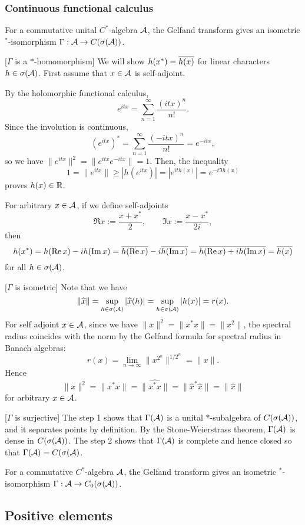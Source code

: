 \documentclass{../exp}
\begin{document}
\subsubsection{Continuous functional calculus}
\begin{thm}
For a commutative unital $C^*$-algebra $\mathcal{A}$, the Gelfand transform gives an isometric $^*$-isomorphism $\Gamma:\cA\to C(\sigma(\cA))$.
\end{thm}
\begin{pf}
[$\Gamma$ is a $*$-homomorphism]
We will show $h(x^*)=\overline{h(x)}$ for linear characters $h\in\sigma(\mathcal{A})$.
First assume that $x\in\mathcal{A}$ is self-adjoint.

By the holomorphic functional calculus,
\[e^{itx}=\sum_{n=1}^\infty\frac{(itx)^n}{n!}.\]
Since the involution is continuous,
\[(e^{itx})^*=\sum_{n=1}^\infty\frac{(-itx)^n}{n!}=e^{-itx},\]
so we have $\|e^{itx}\|^2=\|e^{itx}e^{-itx}\|=1$.
Then, the inequality
\[1=\|e^{itx}\|\ge|h(e^{itx})|=|e^{ith(x)}|=e^{-t\Im h(x)}\]
proves $h(x)\in\mathbb{R}$.

For arbitrary $x\in\mathcal{A}$, if we define self-adjoints
\[\Re x:=\frac{x+x^*}2,\qquad\Im x:=\frac{x-x^*}{2i},\]
then
\[h(x^*)=h(\operatorname{Re} x)-ih(\operatorname{Im} x)=\overline{h(\operatorname{Re} x)}-i\overline{h(\operatorname{Im} x)}=\overline{h(\operatorname{Re} x)+ih(\operatorname{Im} x)}=\overline{h(x)}\]
for all $h\in\sigma(\mathcal{A})$.

[$\Gamma$ is isometric]
Note that we have
\[\|\widehat x\|=\sup_{h\in\sigma(\mathcal{A})}|\widehat x(h)|=\sup_{h\in\sigma(\mathcal{A})}|h(x)|=r(x).\]
For self adjoint $x\in\mathcal{A}$, since we have $\|x\|^2=\|x^*x\|=\|x^2\|$, the spectral radius coincides with the norm by the Gelfand formula for spectral radius in Banach algebras:
\[r(x)=\lim_{n\to\infty}\|x^{2^n}\|^{1/2^n}=\|x\|.\]
Hence
\[\|x\|^2=\|x^*x\|=\|\hat{x^*x}\|=\|\hat{x}^*\hat{x}\|=\|\hat{x}\|\]
for arbitrary $x\in\mathcal{A}$.

[$\Gamma$ is surjective]
The step 1 shows that $\Gamma(\mathcal{A})$ is a unital $*$-subalgebra of $C(\sigma(\mathcal{A}))$, and it separates points by definition.
By the Stone-Weierstrass theorem, $\Gamma(\mathcal{A})$ is dense in $C(\sigma(\mathcal{A}))$.
The step 2 shows that $\Gamma(\mathcal{A})$ is complete and hence closed so that $\Gamma(\mathcal{A})=C(\sigma(\mathcal{A})$.
\end{pf}
\begin{thm}
For a commutative $C^*$-algebra $\mathcal{A}$, the Gelfand transform gives an isometric $^*$-isomorphism $\Gamma:\cA\to C_0(\sigma(\cA))$.
\end{thm}


\subsection{Positive elements}
\end{document}
